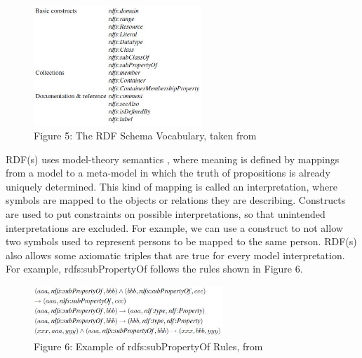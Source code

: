 \documentclass[10pt,journal,compsoc]{IEEEtran}
\begin{document}
\begin{figure}[htbp] %
   \centering
   \includegraphics[width=2.5in]{RDFSchemaVocabPic.jpg} 
  \caption*{Figure 5: The RDF Schema Vocabulary, taken from \cite{_social_2007}}
   \label{}
\label{}   
\end{figure}



RDF(s) uses model-theory semantics , where meaning is defined by mappings from a model to a meta-model in which the truth of propositions is already uniquely determined.  This kind of mapping is called an interpretation, where symbols are mapped to the objects or relations they are describing. Constructs are used to put constraints on possible interpretations, so that unintended interpretations are excluded.  For example, we can use a construct to not allow two symbols used to represent persons to be mapped to the same person.
RDF(s) also allows some axiomatic triples that are true for every model interpretation.  For example, rdfs:subPropertyOf follows the rules shown in Figure 6.

\begin{figure}[htbp] %
   \centering
   \includegraphics[width=2.8in]{subPropertyOfRules.jpg} 
  \caption*{Figure 6: Example of rdfs:subPropertyOf Rules, from \cite{_social_2007}}
   \label{}
\label{}   
\end{figure}
\end{document}
